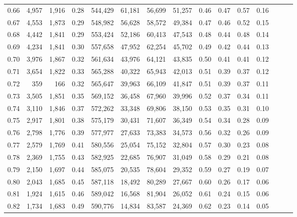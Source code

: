\begin{tabular}{rrrrrrrrrrrrrrr}
0.66 &   4,957 &  1,916 &  0.28 &  544,429 &   61,181 &   56,699 &   51,257 &  0.46 &  0.47 &  0.57 &      0.16 \\
0.67 &   4,553 &  1,873 &  0.29 &  548,982 &   56,628 &   58,572 &   49,384 &  0.47 &  0.46 &  0.52 &      0.15 \\
0.68 &   4,442 &  1,841 &  0.29 &  553,424 &   52,186 &   60,413 &   47,543 &  0.48 &  0.44 &  0.48 &      0.14 \\
0.69 &   4,234 &  1,841 &  0.30 &  557,658 &   47,952 &   62,254 &   45,702 &  0.49 &  0.42 &  0.44 &      0.13 \\
0.70 &   3,976 &  1,867 &  0.32 &  561,634 &   43,976 &   64,121 &   43,835 &  0.50 &  0.41 &  0.41 &      0.12 \\
0.71 &   3,654 &  1,822 &  0.33 &  565,288 &   40,322 &   65,943 &   42,013 &  0.51 &  0.39 &  0.37 &      0.12 \\
0.72 &     359 &    166 &  0.32 &  565,647 &   39,963 &   66,109 &   41,847 &  0.51 &  0.39 &  0.37 &      0.11 \\
0.73 &   3,505 &  1,851 &  0.35 &  569,152 &   36,458 &   67,960 &   39,996 &  0.52 &  0.37 &  0.34 &      0.11 \\
0.74 &   3,110 &  1,846 &  0.37 &  572,262 &   33,348 &   69,806 &   38,150 &  0.53 &  0.35 &  0.31 &      0.10 \\
0.75 &   2,917 &  1,801 &  0.38 &  575,179 &   30,431 &   71,607 &   36,349 &  0.54 &  0.34 &  0.28 &      0.09 \\
0.76 &   2,798 &  1,776 &  0.39 &  577,977 &   27,633 &   73,383 &   34,573 &  0.56 &  0.32 &  0.26 &      0.09 \\
0.77 &   2,579 &  1,769 &  0.41 &  580,556 &   25,054 &   75,152 &   32,804 &  0.57 &  0.30 &  0.23 &      0.08 \\
0.78 &   2,369 &  1,755 &  0.43 &  582,925 &   22,685 &   76,907 &   31,049 &  0.58 &  0.29 &  0.21 &      0.08 \\
0.79 &   2,150 &  1,697 &  0.44 &  585,075 &   20,535 &   78,604 &   29,352 &  0.59 &  0.27 &  0.19 &      0.07 \\
0.80 &   2,043 &  1,685 &  0.45 &  587,118 &   18,492 &   80,289 &   27,667 &  0.60 &  0.26 &  0.17 &      0.06 \\
0.81 &   1,924 &  1,615 &  0.46 &  589,042 &   16,568 &   81,904 &   26,052 &  0.61 &  0.24 &  0.15 &      0.06 \\
0.82 &   1,734 &  1,683 &  0.49 &  590,776 &   14,834 &   83,587 &   24,369 &  0.62 &  0.23 &  0.14 &      0.05 \\

\end{tabular}
